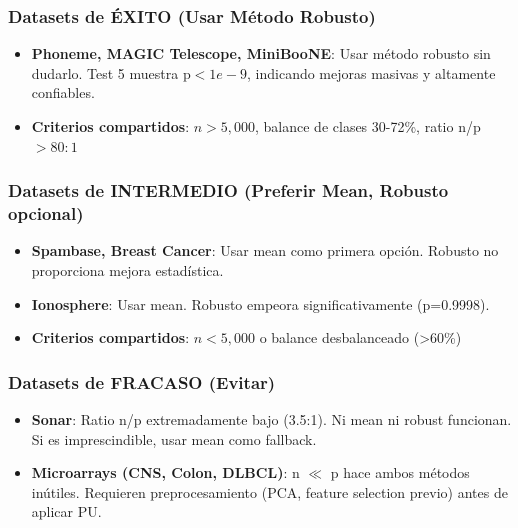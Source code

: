 \documentclass[a4paper,11pt]{article}
\begin{document}
\subsubsection{Datasets de ÉXITO (Usar Método Robusto)}
\begin{itemize}
    \item \textbf{Phoneme, MAGIC Telescope, MiniBooNE}: Usar método robusto sin dudarlo. Test 5 muestra p$<1e-9$, indicando mejoras masivas y altamente confiables.
    \item \textbf{Criterios compartidos}: $n > 5{,}000$, balance de clases 30-72\%, ratio n/p $> 80:1$
\end{itemize}

\subsubsection{Datasets de INTERMEDIO (Preferir Mean, Robusto opcional)}
\begin{itemize}
    \item \textbf{Spambase, Breast Cancer}: Usar mean como primera opción. Robusto no proporciona mejora estadística.
    \item \textbf{Ionosphere}: Usar mean. Robusto empeora significativamente (p=0.9998).
    \item \textbf{Criterios compartidos}: $n < 5{,}000$ o balance desbalanceado (>60\%)
\end{itemize}

\subsubsection{Datasets de FRACASO (Evitar)}
\begin{itemize}
    \item \textbf{Sonar}: Ratio n/p extremadamente bajo (3.5:1). Ni mean ni robust funcionan. Si es imprescindible, usar mean como fallback.
    \item \textbf{Microarrays (CNS, Colon, DLBCL)}: n $\ll$ p hace ambos métodos inútiles. Requieren preprocesamiento (PCA, feature selection previo) antes de aplicar PU.
\end{itemize}
\end{document}

